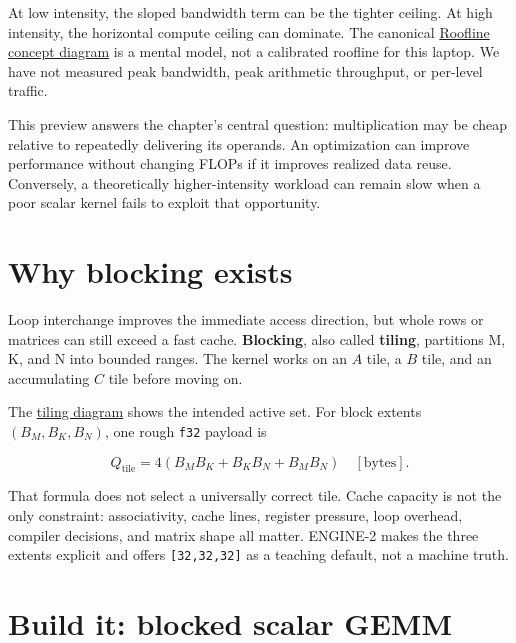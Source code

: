 At low intensity, the sloped bandwidth term can be the tighter ceiling.
At high intensity, the horizontal compute ceiling can dominate. The
canonical
\href{https://github.com/hermonai/inside-the-llm-engine/blob/astra-visual-rewrite/diagrams/linear/roofline-concept.txt}{Roofline
concept diagram} is a mental model, not a calibrated roofline for this
laptop. We have not measured peak bandwidth, peak arithmetic throughput,
or per-level traffic.

This preview answers the chapter's central question: multiplication may
be cheap relative to repeatedly delivering its operands. An optimization
can improve performance without changing FLOPs if it improves realized
data reuse. Conversely, a theoretically higher-intensity workload can
remain slow when a poor scalar kernel fails to exploit that opportunity.

\section{Why blocking exists}\label{why-blocking-exists}

Loop interchange improves the immediate access direction, but whole rows
or matrices can still exceed a fast cache. \textbf{Blocking}, also
called \textbf{tiling}, partitions M, K, and N into bounded ranges. The
kernel works on an \(A\) tile, a \(B\) tile, and an accumulating \(C\)
tile before moving on.

The
\href{https://github.com/hermonai/inside-the-llm-engine/blob/astra-visual-rewrite/diagrams/linear/cache-reuse-and-tiling.txt}{tiling
diagram} shows the intended active set. For block extents
\((B_M,B_K,B_N)\), one rough \texttt{f32} payload is

\begin{equation}
Q_{\mathrm{tile}}=4(B_MB_K+B_KB_N+B_MB_N)\quad[\mathrm{bytes}].
\end{equation}

That formula does not select a universally correct tile. Cache capacity
is not the only constraint: associativity, cache lines, register
pressure, loop overhead, compiler decisions, and matrix shape all
matter. ENGINE-2 makes the three extents explicit and offers
\texttt{{[}32,32,32{]}} as a teaching default, not a machine truth.

\section{Build it: blocked scalar
GEMM}\label{build-it-blocked-scalar-gemm}


